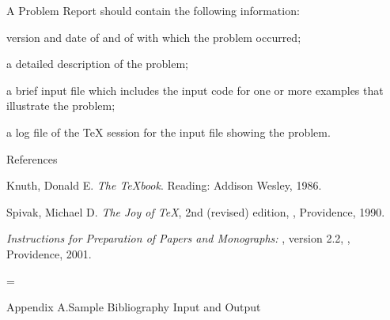 A Problem Report should contain the following information:
\roster
\item version and date of  and of 
  with which the problem occurred;
\item a detailed description of the problem;
\item a brief input file which includes the input code for
  one or more examples that illustrate the problem;
\item a log file of the \TeX{} session for the input file showing the problem.
\endroster

\head References\endhead

\noindent{} Knuth, Donald E. {\it The \TeX{}book}. Reading:
  Addison Wesley, 1986.

\noindent{} Spivak, Michael D. {\it The Joy of \TeX{}},
  2nd (revised) edition, \AMS{}, Providence, 1990.

\noindent{} {\it Instructions for Preparation of Papers and
  Monographs: \AmSTeX}, version 2.2, \AMS{}, Providence, 2001.


\newpage


\begingroup %

\vfuzz=1pt

\newdimen\headlinewidth
\headlinewidth=\hsize
\def\makeheadline{%
  \leftskip=0pt
  \vbox{\vbox to\headlineheight{\vss
      \hbox to\headlinewidth{\hskip0pt plus\headlinewidth\the\headline}%
      \kern-\prevdepth}
    \vskip\headlinespace \vskip-\topskip}%
  \nointerlineskip}

\head Appendix A.\quad Sample Bibliography Input and Output
\endhead

\pageheight{32pc}

